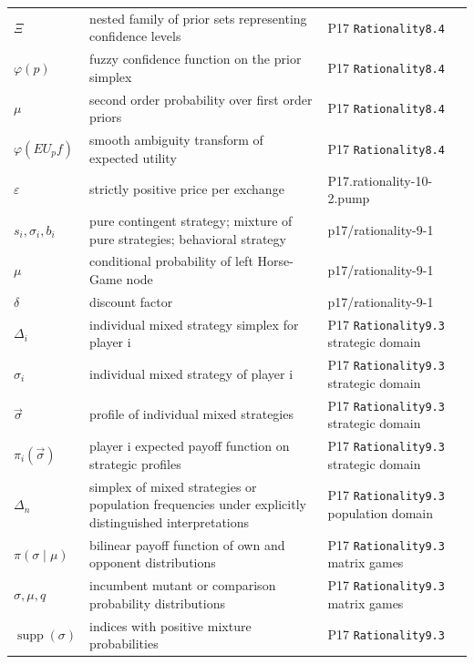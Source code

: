 \begin{longtable}{@{}p{}p{}p{}@{}}
\(\Xi\) & nested family of prior sets representing confidence levels & P17 \texttt{Rationality8.\allowbreak{}4} \\
\(\varphi(p)\) & fuzzy confidence function on the prior simplex & P17 \texttt{Rationality8.\allowbreak{}4} \\
\(\mu\) & second order probability over first order priors & P17 \texttt{Rationality8.\allowbreak{}4} \\
\(\varphi(EU_p f)\) & smooth ambiguity transform of expected utility & P17 \texttt{Rationality8.\allowbreak{}4} \\
\(\varepsilon\) & strictly positive price per exchange & P17.\allowbreak{}rationality-\allowbreak{}10-\allowbreak{}2.\allowbreak{}pump \\
\(s_i,\allowbreak \sigma_i,\allowbreak b_i\) & pure contingent strategy; mixture of pure strategies; behavioral strategy & p17/\allowbreak{}rationality-\allowbreak{}9-\allowbreak{}1 \\
\(\mu\) & conditional probability of left Horse-Game node & p17/\allowbreak{}rationality-\allowbreak{}9-\allowbreak{}1 \\
\(\delta\) & discount factor & p17/\allowbreak{}rationality-\allowbreak{}9-\allowbreak{}1 \\
\(\Delta_i\) & individual mixed strategy simplex for player i & P17 \texttt{Rationality9.\allowbreak{}3} strategic domain \\
\(\sigma_i\) & individual mixed strategy of player i & P17 \texttt{Rationality9.\allowbreak{}3} strategic domain \\
\(\vec\sigma\) & profile of individual mixed strategies & P17 \texttt{Rationality9.\allowbreak{}3} strategic domain \\
\(\pi_i(\vec\sigma)\) & player i expected payoff function on strategic profiles & P17 \texttt{Rationality9.\allowbreak{}3} strategic domain \\
\(\Delta_n\) & simplex of mixed strategies or population frequencies under explicitly distinguished interpretations & P17 \texttt{Rationality9.\allowbreak{}3} population domain \\
\(\pi(\sigma\mid\mu)\) & bilinear payoff function of own and opponent distributions & P17 \texttt{Rationality9.\allowbreak{}3} matrix games \\
\(\sigma,\allowbreak \mu,\allowbreak q\) & incumbent mutant or comparison probability distributions & P17 \texttt{Rationality9.\allowbreak{}3} matrix games \\
\(\operatorname{supp}(\sigma)\) & indices with positive mixture probabilities & P17 \texttt{Rationality9.\allowbreak{}3} \\

\end{longtable}
